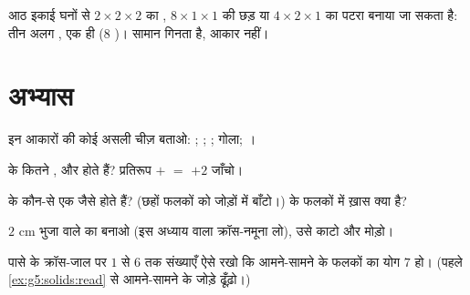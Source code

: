 \begin{example}[वही घन, अलग आकार]\label{ex:g5:solids:rearrange}
आठ इकाई घनों से $2 \times 2 \times 2$ का , $8 \times 1 \times 1$
की छड़ या $4 \times 2 \times 1$ का पटरा बनाया जा सकता है: तीन
अलग , एक ही  ($8$ )।  सामान गिनता है, आकार नहीं।
\end{example}

\section{अभ्यास}

\begin{exercise}[$\star$]\label{exo:g5:solids:1}
इन आकारों की कोई असली चीज़ बताओ: ; ; ; गोला;
।
\end{exercise}

\begin{exercise}[$\star$]\label{exo:g5:solids:2}
 के कितने ,  और  होते हैं? प्रतिरूप
 $+$  $=$  $+ 2$ जाँचो।
\end{exercise}

\begin{exercise}[$\star$]\label{exo:g5:solids:3}
 के कौन-से  एक जैसे होते हैं? (छहों फलकों को जोड़ों में
बाँटो।)  के फलकों में ख़ास क्या है?
\end{exercise}

\begin{exercise}[$\star$]\label{exo:g5:solids:4}
$2$ cm भुजा वाले  का  बनाओ (इस अध्याय वाला क्रॉस-नमूना
लो), उसे काटो और मोड़ो।
\end{exercise}

\begin{exercise}[$\star$]\label{exo:g5:solids:5}
पासे के क्रॉस-जाल पर $1$ से $6$ तक संख्याएँ ऐसे रखो कि
आमने-सामने के फलकों का योग $7$ हो। (पहले
\cref{ex:g5:solids:read} से आमने-सामने के जोड़े ढूँढ़ो।)
\end{exercise}


